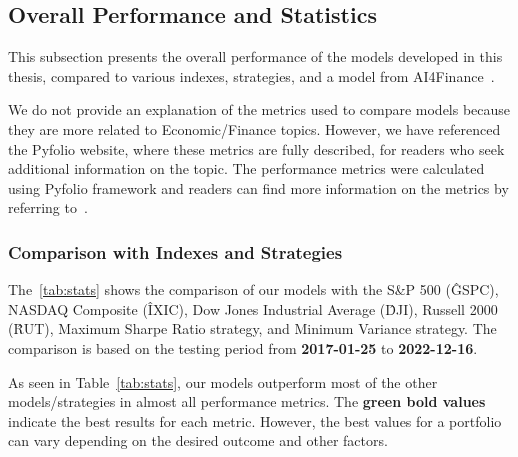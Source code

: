 \documentclass[../xlapes02]{subfiles}
\begin{document}
    \subsection{Overall Performance and Statistics}\label{subsec:overall-performance-and-statistics}
    This subsection presents the overall performance of the models developed in this thesis, compared to various indexes, strategies, and a model from AI4Finance~\cite{finrl-portfolio-allocation-2020}.

    We do not provide an explanation of the metrics used to compare models because they are more related to Economic/Finance topics. However, we have referenced the Pyfolio website, where these metrics are fully described, for readers who seek additional information on the topic. The performance metrics were calculated using Pyfolio framework and readers can find more information on the metrics by referring to~\cite{Pyfolio, Pyfolio-return-analysis}.

    \subsubsection{Comparison with Indexes and Strategies}\label{subsubsec:indexes-and-strategies}
    The~\cref{tab:stats} shows the comparison of our models with the S\&P 500 (\^GSPC), NASDAQ Composite (\^IXIC), Dow Jones Industrial Average (\^DJI), Russell 2000 (\^RUT), Maximum Sharpe Ratio strategy, and Minimum Variance strategy. The comparison is based on the testing period from \textbf{2017-01-25} to \textbf{2022-12-16}.

    As seen in Table~\cref{tab:stats}, our models outperform most of the other models/strategies in almost all performance metrics. The \textcolor[HTML]{00F000}{\textbf{green bold values}} indicate the best results for each metric. However, the best values for a portfolio can vary depending on the desired outcome and other factors.
\end{document}
